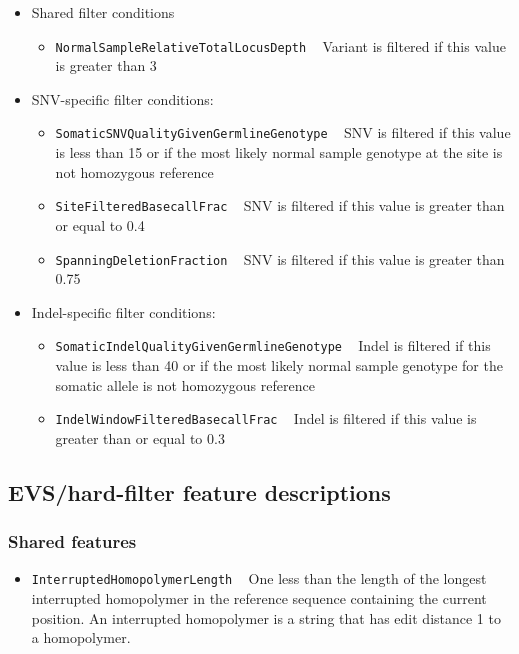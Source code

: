 \documentclass{article}
\begin{document}
\begin{itemize}
    \item Shared filter conditions
    \begin{itemize}
        \item \texttt{NormalSampleRelativeTotalLocusDepth} ~ Variant is filtered if this value is greater than 3
    \end{itemize}
    \item SNV-specific filter conditions:
    \begin{itemize}
        \item \texttt{SomaticSNVQualityGivenGermlineGenotype} ~ SNV is filtered if this value is less than 15 or if the most likely normal sample genotype at the site is not homozygous reference
        \item \texttt{SiteFilteredBasecallFrac} ~ SNV is filtered if this value is greater than or equal to 0.4
        \item \texttt{SpanningDeletionFraction} ~ SNV is filtered if this value is greater than 0.75
    \end{itemize}
    \item Indel-specific filter conditions:
    \begin{itemize}
        \item \texttt{SomaticIndelQualityGivenGermlineGenotype} ~ Indel is filtered if this value is less than 40 or if the most likely normal sample genotype for the somatic allele is not homozygous reference
        \item \texttt{IndelWindowFilteredBasecallFrac} ~ Indel is filtered if this value is greater than or equal to 0.3
    \end{itemize}
\end{itemize}


\subsection{EVS/hard-filter feature descriptions}

\subsubsection{Shared features}
\begin{itemize}

    \item \texttt{InterruptedHomopolymerLength} ~ One less than the length of the longest interrupted homopolymer in the reference sequence containing the current position. An interrupted homopolymer is a string that has edit distance 1 to a homopolymer.

\end{itemize}
\end{document}
